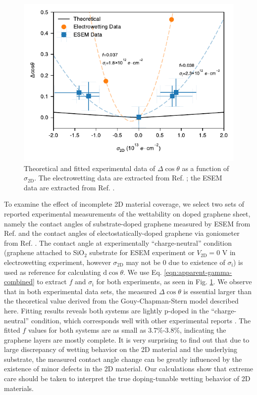 \documentclass[journal=ancac3,manuscript=article,email=true]{achemso}
\begin{document}
\begin{figure}[htbp]
\centering
\includegraphics[width=0.95\linewidth]{../img/plot-fitting.pdf}
\caption{\label{fig:f-nc-exp}
Theoretical and fitted experimental data of \(\Delta\cos\theta\) as a function of \(\sigma_{\mathrm{2D}}\). The electrowetting data are extracted from Ref. \cite{hong_mechanism_2016}; the ESEM data are extracted from Ref. \cite{ashraf_doping-induced_2016}.}
\end{figure}

To examine the effect of incomplete 2D material coverage, we select
two sets of reported experimental measurements of the wettability on
doped graphene sheet, namely the contact angles of substrate-doped
graphene measured by ESEM from Ref. \cite{ashraf_doping-induced_2016}
and the contact angles of electostatically-doped graphene via
goniometer from Ref. \cite{hong_mechanism_2016}. The contact angle at
experimentally ``charge-neutral'' condition (graphene attached to SiO\(_{\text{2}}\)
substrate for ESEM experiment or \(V_{\mathrm{2D}}=0\) V in
electrowetting experiment, however \(\sigma_{\mathrm{2D}}\) may not be 0
due to existence of \(\sigma_{\mathrm{i}}\)) is used as reference for
calculating \(\mathrm{d}\cos\theta\). We use
Eq. \ref{eqn:apparent-gamma-combined} to extract \(f\) and
\(\sigma_{\mathrm{i}}\) for both experiments, as seen in
Fig. \ref{fig:f-nc-exp}. We observe that in both experimental data sets,
the measured \(\Delta \cos \theta\) is essential larger than the
theoretical value derived from the Gouy-Chapman-Stern model described
here. Fitting results reveals both systems are lightly p-doped in the
``charge-neutral'' condition, which corresponds well with other
experimental reports
\cite{Shih2015PartiallyScreened,goniszewski_correlation_2016}.  The
fitted \(f\) values for both systems are as small as 3.7\%-3.8\%,
indicating the graphene layers are mostly complete. It is very
surprising to find out that due to large discrepancy of wetting
behavior on the 2D material and the underlying substrate, the measured
contact angle change can be greatly influenced by the existence of
minor defects in the 2D material. Our calculations show that extreme
care should be taken to interpret the true doping-tunable wetting
behavior of 2D materials.
\end{document}
